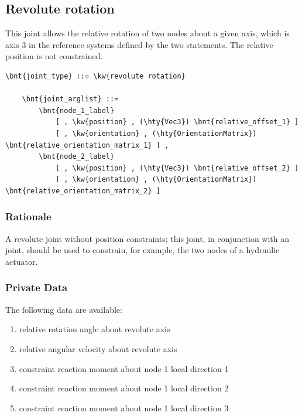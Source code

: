 \subsection{Revolute rotation}
\label{sec:EL:STRUCT:JOINT:REVOLUTE_ROTATION}
This joint allows the relative rotation of two nodes about
a given axis, which is axis 3 in the reference systems defined 
by the two  statements.
The relative position is not constrained.
\begin{Verbatim}[commandchars=\\\{\}]
    \bnt{joint_type} ::= \kw{revolute rotation}

    \bnt{joint_arglist} ::= 
        \bnt{node_1_label}
            [ , \kw{position} , (\hty{Vec3}) \bnt{relative_offset_1} ]
            [ , \kw{orientation} , (\hty{OrientationMatrix}) \bnt{relative_orientation_matrix_1} ] ,
        \bnt{node_2_label}
            [ , \kw{position} , (\hty{Vec3}) \bnt{relative_offset_2} ]
            [ , \kw{orientation} , (\hty{OrientationMatrix}) \bnt{relative_orientation_matrix_2} ]
\end{Verbatim}

\subsubsection{Rationale}
A revolute joint without position constraints; this joint, in conjunction
with an  joint, should be used to constrain, for example,
the two nodes of a hydraulic actuator.

\subsubsection{Private Data}
The following data are available:
\begin{enumerate}
\item {} relative rotation angle about revolute axis
\item {} relative angular velocity about revolute axis
\item {} constraint reaction moment about node 1 local direction 1
\item {} constraint reaction moment about node 1 local direction 2
\item {} constraint reaction moment about node 1 local direction 3
\end{enumerate}

